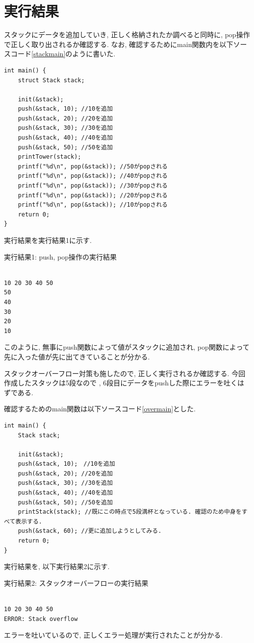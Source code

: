 \documentclass[a4j]{jsarticle}
\begin{document}
    
    
\section{実行結果}
    スタックにデータを追加していき, 正しく格納されたか調べると同時に, pop操作で正しく取り出されるか確認する. 
    なお, 確認するためにmain関数内を以下ソースコード\ref{stackmain}のように書いた. 
    \begin{lstlisting}[label = stackmain, caption = スタックの動作確認のためのmain関数]
int main() {
	struct Stack stack;

	init(&stack);
	push(&stack, 10); //10を追加
	push(&stack, 20); //20を追加
	push(&stack, 30); //30を追加
	push(&stack, 40); //40を追加
	push(&stack, 50); //50を追加
	printTower(stack);
	printf("%d\n", pop(&stack)); //50がpopされる
	printf("%d\n", pop(&stack)); //40がpopされる
	printf("%d\n", pop(&stack)); //30がpopされる
	printf("%d\n", pop(&stack)); //20がpopされる
	printf("%d\n", pop(&stack)); //10がpopされる
	return 0;
}
    \end{lstlisting}

    実行結果を実行結果1に示す. 
    \begin{breakitembox}[l]{実行結果1: push, pop操作の実行結果}
    \begin{verbatim}

10 20 30 40 50
50
40
30
20
10
    \end{verbatim}
    \end{breakitembox}
このように, 無事にpush関数によって値がスタックに追加され, pop関数によって先に入った値が先に出てきていることが分かる. 

スタックオーバーフロー対策も施したので, 正しく実行されるか確認する. 今回作成したスタックは5段なので
, 6段目にデータをpushした際にエラーを吐くはずである. 

確認するためのmain関数は以下ソースコード\ref{overmain}とした. 
\begin{lstlisting}[label = overmain, caption = スタックオーバーフローの動作確認のためのmain関数]
int main() {
	Stack stack;

	init(&stack);
	push(&stack, 10);　//10を追加
	push(&stack, 20); //20を追加
	push(&stack, 30); //30を追加
	push(&stack, 40); //40を追加
	push(&stack, 50); //50を追加
	printStack(stack); //既にこの時点で5段満杯となっている. 確認のため中身をすべて表示する. 
	push(&stack, 60); //更に追加しようとしてみる. 
	return 0;
}
\end{lstlisting}
実行結果を, 以下実行結果2に示す. 
\begin{breakitembox}[l]{実行結果2: スタックオーバーフローの実行結果}
\begin{verbatim}

10 20 30 40 50
ERROR: Stack overflow
\end{verbatim}
\end{breakitembox}
エラーを吐いているので, 正しくエラー処理が実行されたことが分かる. 
\end{document}
